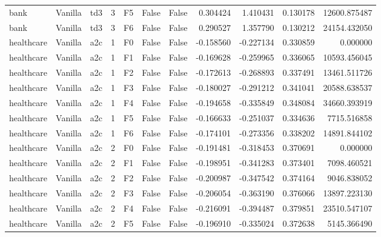 \begin{tabular}{lllrlllrrrr}
      bank & Vanilla &       td3 &     3 &  F5 &           False &            False &  0.304424 &  1.410431 & 0.130178 &     12600.875487 \\
      bank & Vanilla &       td3 &     3 &  F6 &           False &            False &  0.290527 &  1.357790 & 0.130212 &     24154.432050 \\
healthcare & Vanilla &       a2c &     1 &  F0 &           False &            False & -0.158560 & -0.227134 & 0.330859 &         0.000000 \\
healthcare & Vanilla &       a2c &     1 &  F1 &           False &            False & -0.169628 & -0.259965 & 0.336065 &     10593.456045 \\
healthcare & Vanilla &       a2c &     1 &  F2 &           False &            False & -0.172613 & -0.268893 & 0.337491 &     13461.511726 \\
healthcare & Vanilla &       a2c &     1 &  F3 &           False &            False & -0.180027 & -0.291212 & 0.341041 &     20588.638537 \\
healthcare & Vanilla &       a2c &     1 &  F4 &           False &            False & -0.194658 & -0.335849 & 0.348084 &     34660.393919 \\
healthcare & Vanilla &       a2c &     1 &  F5 &           False &            False & -0.166633 & -0.251037 & 0.334636 &      7715.516858 \\
healthcare & Vanilla &       a2c &     1 &  F6 &           False &            False & -0.174101 & -0.273356 & 0.338202 &     14891.844102 \\
healthcare & Vanilla &       a2c &     2 &  F0 &           False &            False & -0.191481 & -0.318453 & 0.370691 &         0.000000 \\
healthcare & Vanilla &       a2c &     2 &  F1 &           False &            False & -0.198951 & -0.341283 & 0.373401 &      7098.460521 \\
healthcare & Vanilla &       a2c &     2 &  F2 &           False &            False & -0.200987 & -0.347542 & 0.374164 &      9046.838052 \\
healthcare & Vanilla &       a2c &     2 &  F3 &           False &            False & -0.206054 & -0.363190 & 0.376066 &     13897.223130 \\
healthcare & Vanilla &       a2c &     2 &  F4 &           False &            False & -0.216091 & -0.394487 & 0.379851 &     23510.547107 \\
healthcare & Vanilla &       a2c &     2 &  F5 &           False &            False & -0.196910 & -0.335024 & 0.372638 &      5145.366490 \\

\end{tabular}
